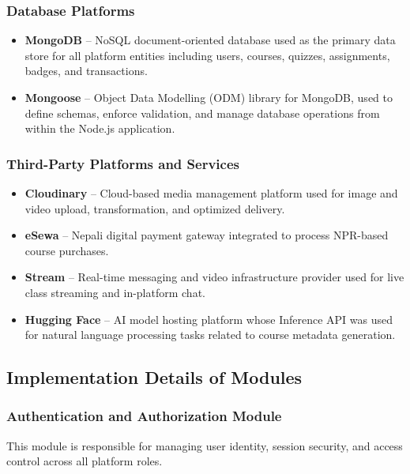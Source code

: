 \subsubsection{Database Platforms}
\begin{itemize}
    \item \textbf{MongoDB} -- NoSQL document-oriented database used as the primary data store for all platform entities including users, courses, quizzes, assignments, badges, and transactions.
    \item \textbf{Mongoose} -- Object Data Modelling (ODM) library for MongoDB, used to define schemas, enforce validation, and manage database operations from within the Node.js application.
\end{itemize}

\subsubsection{Third-Party Platforms and Services}
\begin{itemize}
    \item \textbf{Cloudinary} -- Cloud-based media management platform used for image and video upload, transformation, and optimized delivery.
    \item \textbf{eSewa} -- Nepali digital payment gateway integrated to process NPR-based course purchases.
    \item \textbf{Stream} -- Real-time messaging and video infrastructure provider used for live class streaming and in-platform chat.
    \item \textbf{Hugging Face} -- AI model hosting platform whose Inference API was used for natural language processing tasks related to course metadata generation.
\end{itemize}

\subsection{Implementation Details of Modules}

\subsubsection{Authentication and Authorization Module}

This module is responsible for managing user identity, session security, and access control across all platform roles.

